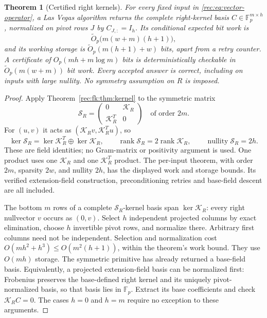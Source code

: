 \documentclass[11pt]{article}
\newtheorem{theorem}{Theorem}[section]
\theoremstyle{definition}
\theoremstyle{remark}
\newcommand{\1}{\mathbf 1}
\providecommand{\Fp}{\mathbb F_p}
\providecommand{\rank}{\operatorname{rank}}
\providecommand{\nullity}{\operatorname{nullity}}
\begin{document}
\begin{theorem}[Certified right kernels]\label{rec:vec:thm:kernel}
For every fixed input in \eqref{rec:eq:vector-operator}, a Las Vegas
algorithm returns the complete right-kernel basis
$C\in\Fp^{m\times h}$, normalized on pivot rows $J$ by $C_{J,:}=I_h$.
Its conditional expected bit work is
\[
 \widetilde O_p\bigl(m(w+m)(h+1)\bigr),
\]
and its working storage is
$\widetilde O_p(m(h+1)+w)$ bits, apart from a retry counter.
A certificate of $O_p(mh+m\log m)$ bits is deterministically
checkable in $\widetilde O_p(m(w+m))$ bit work.
Every accepted answer is correct, including on inputs with large
nullity. No symmetry assumption on $R$ is imposed.
\end{theorem}
\begin{proof}
Apply Theorem~\ref{rec:fk:thm:kernel} to the symmetric matrix
\begin{equation}\label{rec:eq:vector-doubling}
 \mathcal S_R=
 \begin{pmatrix}0&\mathcal K_R\\\mathcal K_R^T&0\end{pmatrix}
 \quad\text{of order }2m.
\end{equation}
For $(u,v)$ it acts as $(\mathcal K_Rv,\mathcal K_R^Tu)$, so
\[
 \ker\mathcal S_R=\ker\mathcal K_R^T\oplus\ker\mathcal K_R,
 \qquad \rank\mathcal S_R=2\rank\mathcal K_R,
 \qquad \nullity\mathcal S_R=2h.
\]
These are field identities; no Gram-matrix or positivity argument is
used. One product uses one $\mathcal K_R$ and one $\mathcal K_R^T$
product. The per-input theorem, with order $2m$, sparsity $2w$, and
nullity $2h$, has the displayed work and storage bounds. Its verified
extension-field construction, preconditioning retries and base-field
descent are all included.

The bottom $m$ rows of a complete $\mathcal S_R$-kernel basis span
$\ker\mathcal K_R$: every right nullvector $v$ occurs as $(0,v)$.
Select $h$ independent projected columns by exact elimination, choose
$h$ invertible pivot rows, and normalize there. Arbitrary first columns
need not be independent. Selection and normalization cost
$O(mh^2+h^3)\le O(m^2(h+1))$, within the theorem's work bound.
They use $O(mh)$ storage. The symmetric primitive has already returned
a base-field basis. Equivalently, a projected extension-field basis
can be normalized first: Frobenius preserves the base-defined right
kernel and its uniquely pivot-normalized basis, so that basis lies in
$\Fp$. Extract its base coefficients and check $\mathcal K_RC=0$.
The cases $h=0$ and $h=m$ require no exception to these arguments.


\end{proof}
\end{document}
